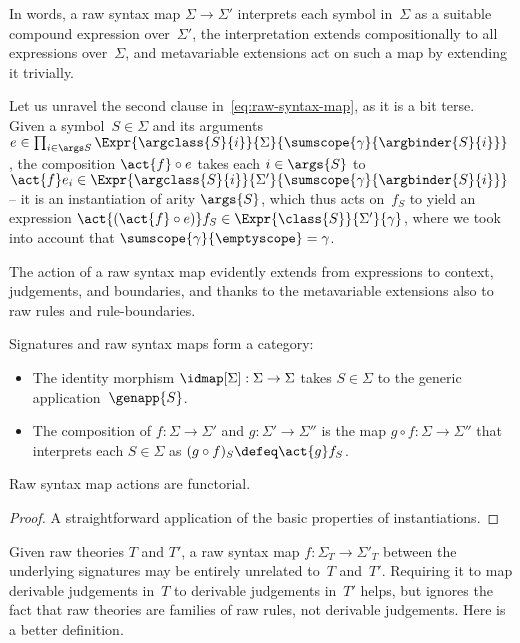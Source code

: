 In words, a raw syntax map $\Sigma \to \Sigma'$ interprets each symbol in~$\Sigma$ as a suitable compound expression over~$\Sigma'$, the interpretation extends compositionally to all expressions over~$\Sigma$, and metavariable extensions act on such a map by extending it trivially.

Let us unravel the second clause in~\eqref{eq:raw-syntax-map}, as it is a bit terse. Given a symbol~$S \in \Sigma$ and its arguments
%
$e \in
   \prod_{i \in \args S} 
   \Expr{\argclass{S}{i}}{\Sigma}{\sumscope{\gamma}{\argbinder{S}{i}}}
$,
the composition $\act{f} \circ e$ takes each $i \in \args{S}$ to
$\act{f} e_i \in 
   \Expr{\argclass{S}{i}}{\Sigma'}{\sumscope{\gamma}{\argbinder{S}{i}}}
$ -- it is an instantiation of arity $\args{S}$, which thus acts on~$f_S$ to yield an expression $\act{(\act{f} \circ e)} f_S \in \Expr{\class{S}}{\Sigma'}{\gamma}$, where we took into account that $\sumscope{\gamma}{\emptyscope} = \gamma$.

The action of a raw syntax map evidently extends from expressions to context, judgements,
and boundaries, and thanks to the metavariable extensions also to raw rules and rule-boundaries.

\begin{proposition}
  Signatures and raw syntax maps form a category:
  \begin{itemize}

  \item
    The identity morphism $\idmap[\Sigma] : \Sigma \to \Sigma$ takes $S \in \Sigma$ to the generic application~$\genapp{S}$.

  \item
    The composition of $f : \Sigma \to \Sigma'$ and $g : \Sigma' \to \Sigma''$ is the
    map $g \circ f : \Sigma \to \Sigma''$ that interprets each $S \in \Sigma$ as $(g \circ f)_S \defeq \act{g} f_S$.
  \end{itemize}
  Raw syntax map actions are functorial.
\end{proposition}

\begin{proof}
  A straightforward application of the basic properties of instantiations.
\end{proof}

Given raw theories $T$ and $T'$, a raw syntax map $f : \Sigma_T \to \Sigma'_T$ between the underlying signatures may be entirely unrelated to~$T$ and~$T'$. Requiring it to map derivable judgements in~$T$ to derivable judgements in~$T'$ helps, but ignores the fact that raw theories are families of raw rules, not derivable judgements. Here is a better definition.

